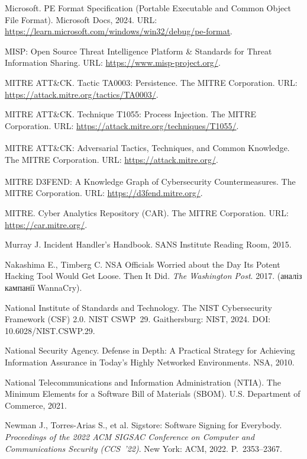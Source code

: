  Microsoft. PE Format Specification (Portable Executable and Common Object File Format). Microsoft Docs, 2024. URL: \url{https://learn.microsoft.com/windows/win32/debug/pe-format}.

 MISP: Open Source Threat Intelligence Platform \& Standards for Threat Information Sharing. URL: \url{https://www.misp-project.org/}.

 MITRE ATT\&CK. Tactic TA0003: Persistence. The MITRE Corporation. URL: \url{https://attack.mitre.org/tactics/TA0003/}.

 MITRE ATT\&CK. Technique T1055: Process Injection. The MITRE Corporation. URL: \url{https://attack.mitre.org/techniques/T1055/}.

 MITRE ATT\&CK\textsuperscript{\textregistered}: Adversarial Tactics, Techniques, and Common Knowledge. The MITRE Corporation. URL: \url{https://attack.mitre.org/}.

 MITRE D3FEND\textsuperscript{\texttrademark}: A Knowledge Graph of Cybersecurity Countermeasures. The MITRE Corporation. URL: \url{https://d3fend.mitre.org/}.

 MITRE. Cyber Analytics Repository (CAR). The MITRE Corporation. URL: \url{https://car.mitre.org/}.

 Murray J. Incident Handler's Handbook. SANS Institute Reading Room, 2015.

 Nakashima E., Timberg C. NSA Officials Worried about the Day Its Potent Hacking Tool Would Get Loose. Then It Did. \emph{The Washington Post}. 2017. (аналіз кампанії WannaCry).

 National Institute of Standards and Technology. The NIST Cybersecurity Framework (CSF) 2.0. NIST CSWP~29. Gaithersburg: NIST, 2024. DOI: 10.6028/NIST.CSWP.29.

 National Security Agency. Defense in Depth: A Practical Strategy for Achieving Information Assurance in Today's Highly Networked Environments. NSA, 2010.

 National Telecommunications and Information Administration (NTIA). The Minimum Elements for a Software Bill of Materials (SBOM). U.S. Department of Commerce, 2021.

 Newman J., Torres-Arias S., et al. Sigstore: Software Signing for Everybody. \emph{Proceedings of the 2022 ACM SIGSAC Conference on Computer and Communications Security (CCS~'22)}. New York: ACM, 2022. P.~2353--2367.

